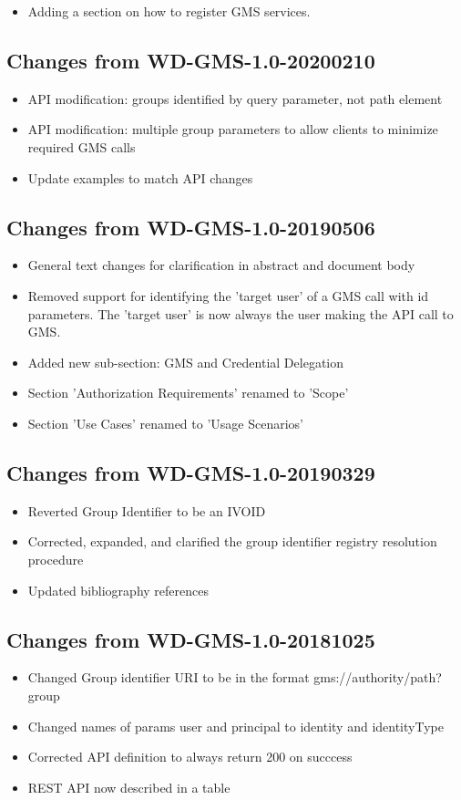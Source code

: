 \documentclass[11pt,a4paper]{ivoa}
\begin{document}
\begin{itemize}
\item Adding a section on how to register GMS services.
\end{itemize}

\subsection{Changes from WD-GMS-1.0-20200210}
\begin{itemize}
\item{API modification: groups identified by query parameter, not path element}
\item{API modification: multiple group parameters to allow clients to minimize required GMS calls}
\item{Update examples to match API changes}
\end{itemize}

\subsection{Changes from WD-GMS-1.0-20190506}
\begin{itemize}
\item{General text changes for clarification in abstract and document body}
\item{Removed support for identifying the 'target user' of a GMS call with id parameters.  The 'target user' is now always the user making the API call to GMS.}
\item{Added new sub-section: GMS and Credential Delegation}
\item{Section 'Authorization Requirements' renamed to 'Scope'}
\item{Section 'Use Cases' renamed to 'Usage Scenarios'}
\end{itemize}

\subsection{Changes from WD-GMS-1.0-20190329}
\begin{itemize}
\item{Reverted Group Identifier to be an IVOID}
\item{Corrected, expanded, and clarified the group identifier registry resolution procedure}
\item{Updated bibliography references}
\end{itemize}

\subsection{Changes from WD-GMS-1.0-20181025}
\begin{itemize}
\item{Changed Group identifier URI to be in the format gms://authority/path?group}
\item{Changed names of params user and principal to identity and identityType}
\item{Corrected API definition to always return 200 on succcess}
\item{REST API now described in a table}
\end{itemize}



\end{document}
